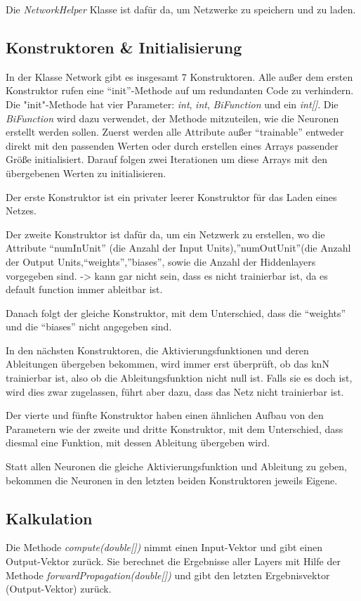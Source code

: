 \documentclass[paper=A4,pagesize=auto,12pt,headinclude=true,footinclude=true,BCOR=0mm,DIV=calc]{scrartcl}
\begin{document}
Die \textit{NetworkHelper} Klasse ist dafür da, um Netzwerke zu speichern und zu laden.


\subsection{Konstruktoren \& Initialisierung}
In der Klasse Network gibt es insgesamt 7 Konstruktoren.
Alle außer dem ersten Konstruktor rufen eine “init”-Methode auf um redundanten Code zu verhindern. Die "init"-Methode hat vier Parameter: \textit{int}, \textit{int}, \textit{BiFunction} und ein \textit{int[]}. Die \textit{BiFunction} wird dazu verwendet, der Methode mitzuteilen, wie die Neuronen erstellt werden sollen.
Zuerst werden alle Attribute außer “trainable” entweder direkt mit den passenden Werten oder durch erstellen eines Arrays passender Größe initialisiert.
Darauf folgen zwei Iterationen um diese Arrays mit den übergebenen Werten zu initialisieren.

Der erste Konstruktor ist ein privater leerer Konstruktor für das Laden eines Netzes. 

Der zweite Konstruktor ist dafür da, um ein Netzwerk zu erstellen, wo die Attribute “numInUnit” (die Anzahl der Input Units),”numOutUnit”(die Anzahl der Output Units,“weights”,”biases”, sowie die Anzahl der Hiddenlayers vorgegeben sind.
-> kann gar nicht sein, dass es nicht trainierbar ist, da es default function immer ableitbar ist.

Danach folgt der gleiche Konstruktor, mit dem Unterschied, dass die “weights” und die “biases” nicht angegeben sind.

In den nächsten Konstruktoren, die Aktivierungsfunktionen und deren Ableitungen übergeben bekommen, wird immer erst überprüft, ob das knN trainierbar ist, also ob die Ableitungsfunktion nicht null ist. Falls sie es doch ist, wird dies zwar zugelassen, führt aber dazu, dass das Netz nicht trainierbar ist. 

Der vierte und fünfte Konstruktor haben einen ähnlichen Aufbau von den Parametern wie der zweite und dritte Konstruktor, mit dem Unterschied, dass diesmal eine Funktion, mit dessen Ableitung übergeben wird.

Statt allen Neuronen die gleiche Aktivierungsfunktion und Ableitung zu geben, bekommen die Neuronen in den letzten beiden Konstruktoren jeweils Eigene.


\subsection{Kalkulation}
Die Methode \textit{compute(double[])} nimmt einen Input-Vektor und gibt einen Output-Vektor zurück. Sie berechnet die Ergebnisse aller Layers mit Hilfe der Methode \textit{forwardPropagation(double[])} und gibt den letzten Ergebnisvektor (Output-Vektor) zurück.
\end{document}
